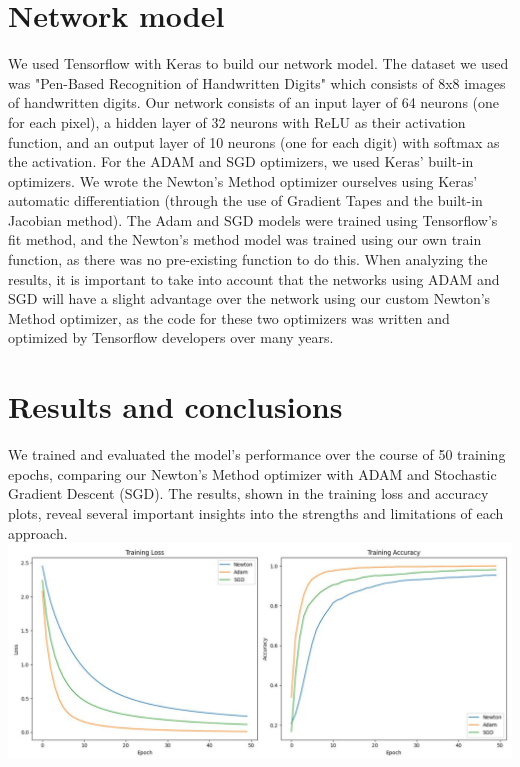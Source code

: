 \documentclass[10pt]{article}
\begin{document}
\section*{Network model}
We used Tensorflow with Keras to build our network model. The dataset we used was "Pen-Based Recognition of Handwritten Digits" which consists of 8x8 images of handwritten digits. Our network consists of an input layer of 64 neurons (one for each pixel), a hidden layer of 32 neurons with ReLU as their activation function, and an output layer of 10 neurons (one for each digit) with softmax as the activation. For the ADAM and SGD optimizers, we used Keras' built-in optimizers. We wrote the Newton's Method optimizer ourselves using Keras' automatic differentiation (through the use of Gradient Tapes and the built-in Jacobian method). The Adam and SGD models were trained using Tensorflow's fit method, and the Newton's method model was trained using our own train function, as there was no pre-existing function to do this. When analyzing the results, it is important to take into account that the networks using ADAM and SGD will have a slight advantage over the network using our custom Newton's Method optimizer, as the code for these two optimizers was written and optimized by Tensorflow developers over many years.

\section*{Results and conclusions}
We trained and evaluated the model's performance over the course of 50 training epochs, comparing our Newton's Method optimizer with ADAM and Stochastic Gradient Descent (SGD). The results, shown in the training loss and accuracy plots, reveal several important insights into the strengths and limitations of each approach.\\
\includegraphics[max width=\textwidth, center]{2025_04_08_c5129b05008e68f8b3cdg-2}
\end{document}
